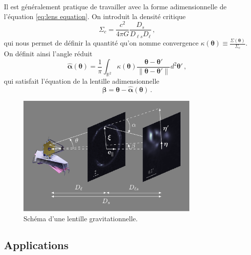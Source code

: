 Il est généralement pratique de travailler avec la forme adimensionnelle de l'équation \eqref{eq:lens equation}. 
On introduit la densité critique 
\begin{equation}\label{eq:densite critique}
        \Sigma_c = \frac{c^2}{4 \pi G}\frac{D_{s}}{D_{\ell s} D_\ell}\, ,
\end{equation} 
qui nous permet de définir la quantité qu'on nomme convergence $\displaystyle \kappa(\boldsymbol{ \theta} ) \equiv \frac{\Sigma(\boldsymbol{ \theta})}{\Sigma_c}$. 
On définit ainsi l'angle réduit 
\begin{equation}\label{eq:alpha adim}
        \hat{\boldsymbol{ \alpha}} (\boldsymbol{ \theta}) = \frac{1}{\pi}\int_{\mathbb{R}^{2}} \kappa(\boldsymbol{ \theta} )
        \frac{\boldsymbol{ \theta} - \boldsymbol{ \theta}'  }{\lVert \boldsymbol{ \theta} - \boldsymbol{ \theta}' \rVert  } d^{2}\boldsymbol{ \theta}'\, ,
\end{equation} 
qui satisfait l'équation de la lentille adimensionnelle 
\begin{equation}\label{eq:lens equation adim}
        \boldsymbol{ \beta} = \boldsymbol{ \theta} - \hat{\boldsymbol{ \alpha}}(\boldsymbol{ \theta})\, . 
\end{equation}

\begin{figure}[H]
        \centering
        \includegraphics[width=0.8\textwidth]{figures/lensing_cartoon}
        \caption{Schéma d'une lentille gravitationnelle.}
        \label{fig:cartoon}
\end{figure}


\subsection{Applications}



